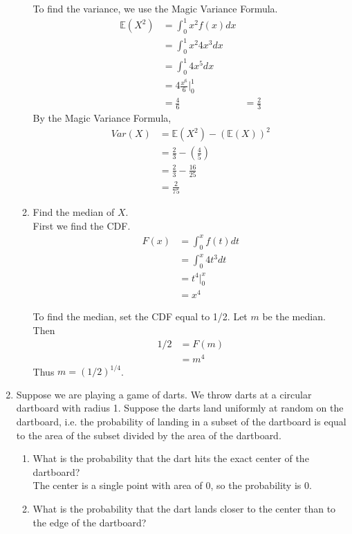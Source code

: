 \documentclass[12pt]{article}
\def\E{{\mathbb E}}
\begin{document}
\begin{enumerate}
\begin{enumerate}
To find the variance, we use the Magic Variance Formula.
\begin{align*}
\E(X^2) &= \int_0^1 x^2 f(x) dx \\
&= \int_0^1 x^2 4x^3 dx \\
&= \int_0^1 4x^5 dx \\
&= 4 \frac{x^6}{6}\Bigr|_0^1 \\
&= \frac{4}{6} &= \frac{2}{3}
\end{align*}
By the Magic Variance Formula,
\begin{align*}
Var(X) &= \E(X^2) - (\E(X))^2 \\
&= \frac{2}{3} - \left( \frac{4}{5} \right) \\
&= \frac{2}{3} - \frac{16}{25} \\
&= \frac{2}{75}
\end{align*}

\item Find the median of $X$.\\
First we find the CDF.
\begin{align*}
F(x) &= \int_0^x f(t) dt \\
&= \int_0^x 4t^3 dt \\
&= t^4 \Bigr|_0^x \\
&= x^4
\end{align*}

To find the median, set the CDF equal to 1/2. Let $m$ be the median. Then
\begin{align*}
1/2 &= F(m) \\
&= m^4
\end{align*}
Thus $m = (1/2)^{1/4}$.

\end{enumerate}

\item Suppose we are playing a game of darts. We throw darts at a circular dartboard with radius 1. Suppose the darts land uniformly at random on the dartboard, i.e. the probability of landing in a subset of the dartboard is equal to the area of the subset divided by the area of the dartboard.
\begin{enumerate}
\item What is the probability that the dart hits the exact center of the dartboard?\\

The center is a single point with area of 0, so the probability is 0.

\item What is the probability that the dart lands closer to the center than to the edge of the dartboard?\\


\end{enumerate}
\end{enumerate}
\end{document}

